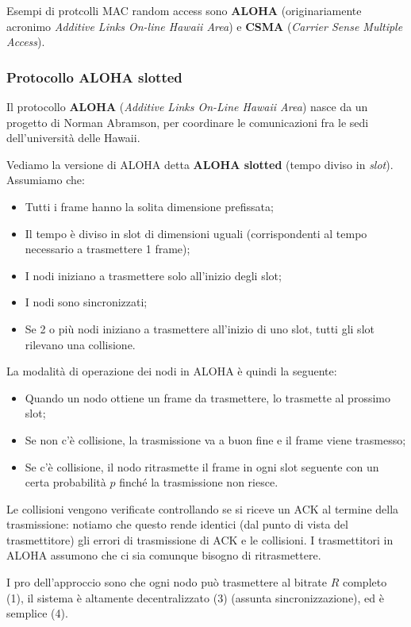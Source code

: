 \documentclass[a4paper,11pt]{article}
\begin{document}
Esempi di protcolli MAC random access sono \textbf{ALOHA} (originariamente acronimo \textit{Additive Links On-line Hawaii Area}) e \textbf{CSMA} (\textit{Carrier Sense Multiple Access}).

\subsubsection{Protocollo ALOHA slotted}
Il protocollo \textbf{ALOHA} (\textit{Additive Links On-Line Hawaii Area}) nasce da un progetto di Norman Abramson, per coordinare le comunicazioni fra le sedi dell'università delle Hawaii.

Vediamo la versione di ALOHA detta \textbf{ALOHA slotted} (tempo diviso in \textit{slot}).
Assumiamo che:
\begin{itemize}
	\item Tutti i frame hanno la solita dimensione prefissata;
	\item Il tempo è diviso in slot di dimensioni uguali (corrispondenti al tempo necessario a trasmettere 1 frame);
	\item I nodi iniziano a trasmettere solo all'inizio degli slot;
	\item I nodi sono sincronizzati;
	\item Se 2 o più nodi iniziano a trasmettere all'inizio di uno slot, tutti gli slot rilevano una collisione.
\end{itemize}

La modalità di operazione dei nodi in ALOHA è quindi la seguente:
\begin{itemize}
	\item Quando un nodo ottiene un frame da trasmettere, lo trasmette al prossimo slot;
	\item Se non c'è collisione, la trasmissione va a buon fine e il frame viene trasmesso;
	\item Se c'è collisione, il nodo ritrasmette il frame in ogni slot seguente con un certa probabilità $p$ finché la trasmissione non riesce.
\end{itemize}

Le collisioni vengono verificate controllando se si riceve un ACK al termine della trasmissione: notiamo che questo rende identici (dal punto di vista del trasmettitore) gli errori di trasmissione di ACK e le collisioni. I trasmettitori in ALOHA assumono che ci sia comunque bisogno di ritrasmettere.

I pro dell'approccio sono che ogni nodo può trasmettere al bitrate $R$ completo (1), il sistema è altamente decentralizzato (3) (assunta sincronizzazione), ed è semplice (4).
\end{document}
